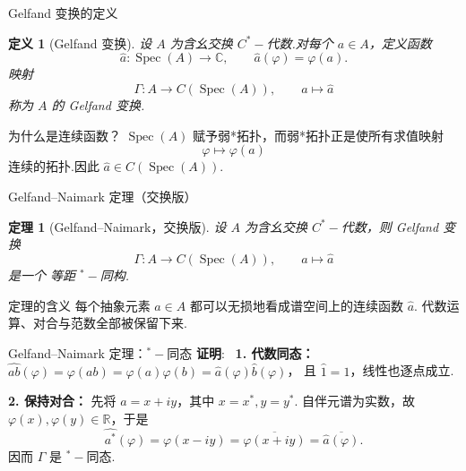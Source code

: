 \documentclass[notheorems,11pt]{beamer}
\theoremstyle{plain}
\newtheorem{theorem}{定理}
\numberwithin{theorem}{section}
\newtheorem{definition}{定义}
\numberwithin{lemma}{section}
\numberwithin{corollary}{section}
\theoremstyle{example}
\renewenvironment{proof}[1][证明]{\textbf{#1}:~}{\qed\par}
\DeclareMathOperator{\Spec}{Spec}
\begin{document}
\begin{frame}{Gelfand 变换的定义}
  \begin{definition}[Gelfand 变换]
    设 $A$ 为含幺交换 $C^*-\!$代数.对每个 $a\in A$，定义函数
    \[
      \widehat a:\Spec(A)\longrightarrow\mathbb C,\qquad
      \widehat a(\varphi)=\varphi(a).
    \]
    映射
    \[
      \Gamma:A\longrightarrow C(\Spec(A)),\qquad
      a\longmapsto\widehat a
    \]
    称为 $A$ 的 \alert{Gelfand 变换}.
  \end{definition}
  \pause
  \begin{block}{为什么是连续函数？}
    $\Spec(A)$ 赋予弱*拓扑，而弱*拓扑正是使所有求值映射
    \[
      \varphi\longmapsto \varphi(a)
    \]
    连续的拓扑.因此 $\widehat a\in C(\Spec(A))$.
  \end{block}
\end{frame}

\begin{frame}{Gelfand--Naimark 定理（交换版）}
  \begin{theorem}[Gelfand--Naimark，交换版]
    设 $A$ 为含幺交换 $C^*-\!$代数，则 Gelfand 变换
    \[
      \Gamma:A\longrightarrow C(\Spec(A)),\qquad
      a\longmapsto\widehat a
    \]
    是一个 \alert{等距 ${}^*-\!$同构}.
  \end{theorem}
  \pause
  \begin{block}{定理的含义}
    每个抽象元素 $a\in A$ 都可以无损地看成谱空间上的连续函数 $\widehat a$.
    代数运算、对合与范数全部被保留下来.
  \end{block}
\end{frame}

\begin{frame}{Gelfand--Naimark 定理：${}^*-\!$同态}
  \begin{proof}\small
    \textbf{1. 代数同态：}
    $\widehat{ab}(\varphi)=\varphi(ab)=\varphi(a)\varphi(b)=\widehat{a}(\varphi)\widehat{b}(\varphi)$，
    且 $\widehat{1}=1$，线性也逐点成立.

    \medskip
    \textbf{2. 保持对合：}
    先将 $a=x+iy$，其中 $x=x^*,y=y^*$.
    自伴元谱为实数，故 $\varphi(x),\varphi(y)\in\mathbb R$，于是
    \[
      \widehat{a^*}(\varphi)=\varphi(x-iy)
      =\overline{\varphi(x+iy)}
      =\overline{\widehat a(\varphi)}.
    \]
    因而 $\Gamma$ 是 ${}^*-\!$同态.
     \let\qed\relax
  \end{proof}
\end{frame}
\end{document}
